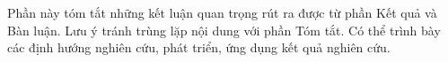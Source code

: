 Phần này tóm tắt những kết luận quan trọng rút ra được từ phần Kết quả và Bàn luận. Lưu ý tránh trùng lặp nội dung với phần Tóm tắt. Có thể trình bày các định hướng nghiên cứu, phát triển, ứng dụng kết quả nghiên cứu.